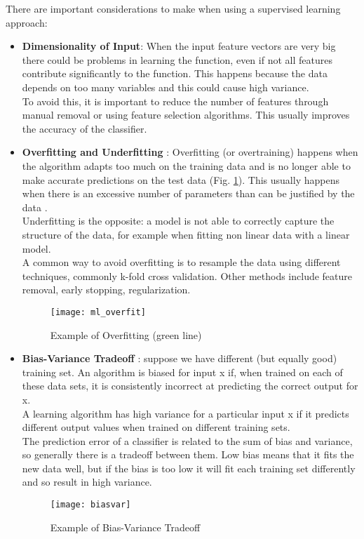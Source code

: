 There are important considerations to make when using a supervised learning approach:
\begin{itemize}
	\item \textbf{Dimensionality of Input}: When the input feature vectors are very big there could be problems in learning the function, even if not all features contribute significantly to the function. This happens because the data depends on too many variables and this could cause high variance. \\
	To avoid this, it is important to reduce the number of features through manual removal or using feature selection algorithms. This usually improves the accuracy of the classifier.
	\item \textbf{Overfitting and Underfitting} \cite{overfit}: Overfitting (or overtraining) happens when the algorithm adapts too much on the training data and is no longer able to make accurate predictions on the test data (Fig. \ref{fig:ml_overfit}). This usually happens when there is an excessive number of parameters than can be justified by the data \cite{camb_over}. \\
	Underfitting is the opposite: a model is not able to correctly capture the structure of the data, for example when fitting non linear data with a linear model.\\
	A common way to avoid overfitting is to resample the data using different techniques, commonly k-fold cross validation. Other methods include feature removal, early stopping, regularization.
	
	\begin{figure}[H]
		\centering
		\texttt{[image: ml\_overfit]}
		\caption{Example of Overfitting (green line) \cite{wiki:ml_overfit}}
		\label{fig:ml_overfit}
	\end{figure}	
	
	\item \textbf{Bias-Variance Tradeoff} \cite{biasvar}: suppose we have different (but equally good) training set. An algorithm is biased for input x if, when trained on each of these data sets, it is consistently incorrect at predicting the correct output for x. \\
	A learning algorithm has high variance for a particular input x if it predicts different output values when trained on different training sets. \\
	The prediction error of a classifier is related to the sum of bias and variance, so generally there is a tradeoff between them. Low bias means that it fits the new data well, but if the bias is too low it will fit each training set differently and so result in high variance.
	\begin{figure}[H]
		\centering
		\texttt{[image: biasvar]}
		\caption{Example of Bias-Variance Tradeoff \cite{biasvarTradeoff}}
		\label{fig:biasvar}
	\end{figure}	
\end{itemize}

